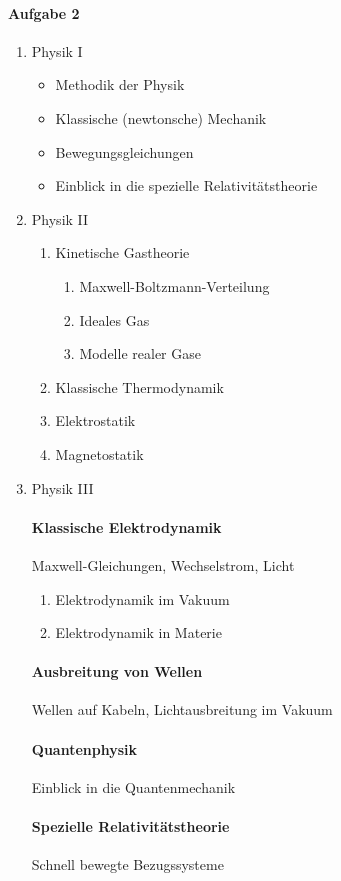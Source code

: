 \documentclass[ngerman, a4paper, 12pt]{scrartcl}
\begin{document}
\paragraph{Aufgabe 2}
\begin{enumerate}
    \item Physik I
    \begin{itemize}
        \item Methodik der Physik
        \item Klassische (newtonsche) Mechanik
        \item Bewegungsgleichungen
        \item Einblick in die spezielle Relativitätstheorie
    \end{itemize}
    \item Physik II
        \begin{enumerate}
            \item Kinetische Gastheorie
            \begin{enumerate}
                \item Maxwell-Boltzmann-Verteilung
                \item Ideales Gas
                \item Modelle realer Gase
            \end{enumerate}
            \item Klassische Thermodynamik
            \item Elektrostatik
            \item Magnetostatik
        \end{enumerate}
    \item Physik III
        \paragraph{Klassische Elektrodynamik}
        Maxwell-Gleichungen, Wechselstrom, Licht
        \begin{enumerate}
            \item Elektrodynamik im Vakuum
            \item Elektrodynamik in Materie
        \end{enumerate}
        \paragraph{Ausbreitung von Wellen} Wellen auf Kabeln, Lichtausbreitung im Vakuum
        \paragraph{Quantenphysik} Einblick in die Quantenmechanik
        \paragraph{Spezielle Relativitätstheorie} Schnell bewegte Bezugssysteme
\end{enumerate}
\end{document}
